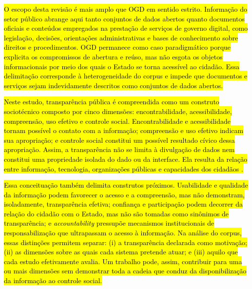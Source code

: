 \documentclass[brazilian]{sbc2025}
\newif\ifhl \hltrue
\newcommand{\rev}[1]{\ifhl\sethlcolor{yellow}\hl{#1}\else#1\fi}
\begin{document}
\rev{O escopo desta revisão é mais amplo que OGD em sentido estrito. Informação do setor público abrange aqui tanto conjuntos de dados abertos quanto documentos oficiais e conteúdos empregados na prestação de serviços de governo digital, como legislação, decisões, orientações administrativas e bases de conhecimento sobre direitos e procedimentos. OGD permanece como caso paradigmático porque explicita os compromissos de abertura e reúso, mas não esgota os objetos informacionais por meio dos quais o Estado se torna acessível ao cidadão. Essa delimitação corresponde à heterogeneidade do corpus e impede que documentos e serviços sejam indevidamente descritos como conjuntos de dados abertos.}

\rev{Neste estudo, transparência pública é compreendida como um construto sociotécnico composto por cinco dimensões: encontrabilidade, acessibilidade, compreensão, uso efetivo e controle social. Encontrabilidade e acessibilidade tornam possível o contato com a informação; compreensão e uso efetivo indicam sua apropriação; e controle social constitui um possível resultado cívico dessa apropriação. Assim, a transparência não se limita à divulgação de dados nem constitui uma propriedade isolada do dado ou da interface. Ela resulta da relação entre informação, tecnologia, organizações públicas e capacidades dos cidadãos \mbox{\citep{MichenerBersch2013,Meijer2013,Heald2006}}.}

\rev{Essa conceituação também delimita construtos próximos. Usabilidade e qualidade da informação podem favorecer o acesso e a compreensão, mas não demonstram, isoladamente, transparência efetiva; confiança e participação podem decorrer da relação do cidadão com o Estado, mas não são tomadas como sinônimos de transparência; e \emph{accountability} pressupõe mecanismos institucionais de responsabilização que ultrapassam o acesso à informação. Na análise do corpus, essas distinções permitem separar: (i) a transparência declarada como motivação; (ii) as dimensões sobre as quais cada sistema pretende atuar; e (iii) aquilo que cada estudo efetivamente avalia. Um trabalho pode, assim, contribuir para uma ou mais dimensões sem demonstrar toda a cadeia que conduz da disponibilização da informação ao controle social.}
\end{document}
